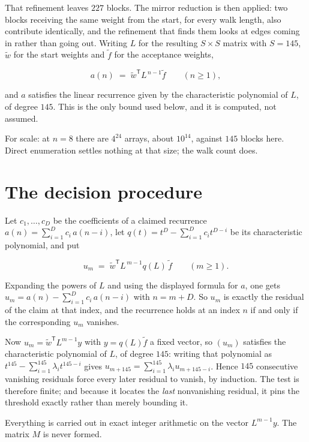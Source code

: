 \documentclass[11pt]{article}
\theoremstyle{definition}
\begin{document}
That refinement leaves $227$ blocks. The mirror reduction is then applied: two blocks receiving the same weight from the start, for every walk length, also contribute identically, and the refinement that finds them looks at edges coming in rather than going out. Writing $L$ for the resulting $S \times S$ matrix with $S = 145$, $\tilde w$ for the start weights and $\tilde f$ for the acceptance weights,

\[a(n) \;=\; \tilde w^{\mathsf T} L^{\,n-1} \tilde f \qquad (n \ge 1),\]

and $a$ satisfies the linear recurrence given by the characteristic polynomial of $L$, of degree $145$. This is the only bound used below, and it is computed, not assumed.

For scale: at $n = 8$ there are $4^{24}$ arrays, about $10^{14}$, against $145$ blocks here. Direct enumeration settles nothing at that size; the walk count does.

\section{The decision procedure}

Let $c_1,\dots,c_D$ be the coefficients of a claimed recurrence $a(n) = \sum_{i=1}^{D} c_i\,a(n-i)$, let $q(t) = t^{D} - \sum_{i=1}^{D} c_i t^{D-i}$ be its characteristic polynomial, and put

\[u_m \;=\; \tilde w^{\mathsf T} L^{\,m-1} q(L)\,\tilde f \qquad (m \ge 1).\]

Expanding the powers of $L$ and using the displayed formula for $a$, one gets $u_m = a(n) - \sum_{i=1}^{D} c_i\,a(n-i)$ with $n = m + D$. So $u_m$ is exactly the residual of the claim at that index, and the recurrence holds at an index $n$ if and only if the corresponding $u_m$ vanishes.

Now $u_m = \tilde w^{\mathsf T} L^{m-1} y$ with $y = q(L)\tilde f$ a fixed vector, so $(u_m)$ satisfies the characteristic polynomial of $L$, of degree $145$: writing that polynomial as $t^{145} - \sum_{i=1}^{145} \lambda_i t^{145-i}$ gives $u_{m+145} = \sum_{i=1}^{145} \lambda_i u_{m+145-i}$. Hence $145$ consecutive vanishing residuals force every later residual to vanish, by induction. The test is therefore finite; and because it locates the {\itshape last} nonvanishing residual, it pins the threshold exactly rather than merely bounding it.

Everything is carried out in exact integer arithmetic on the vector $L^{m-1}y$. The matrix $M$ is never formed.
\end{document}
